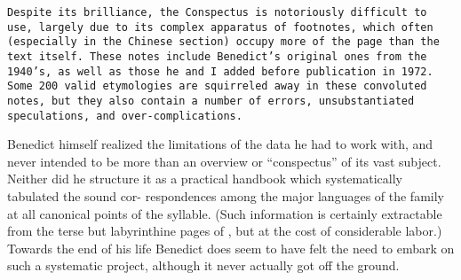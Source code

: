 {\tt Despite its brilliance, the Conspectus is notoriously difficult to use, largely due to its complex apparatus of footnotes, which often (especially in the Chinese section) occupy more of the page than the text itself. These notes include Benedict’s original ones from the 1940’s, as well as those he and I added before publication in 1972. Some 200 valid etymologies are squirreled away in these convoluted notes, but they also contain a number of errors, unsubstantiated speculations, and over-complications.

Benedict himself realized the limitations of the data he had to work with, and never intended \textit{} to be more than an overview or “conspectus” of its vast subject. Neither did he structure it as a practical handbook which systematically tabulated the sound cor- respondences among the major languages of the family at all canonical points of the syllable. (Such information is certainly extractable from the terse but labyrinthine pages of \textit{}, but at the cost of considerable labor.) Towards the end of his life Benedict does seem to have felt the need to embark on such a systematic project, although it never actually got off the ground.}

